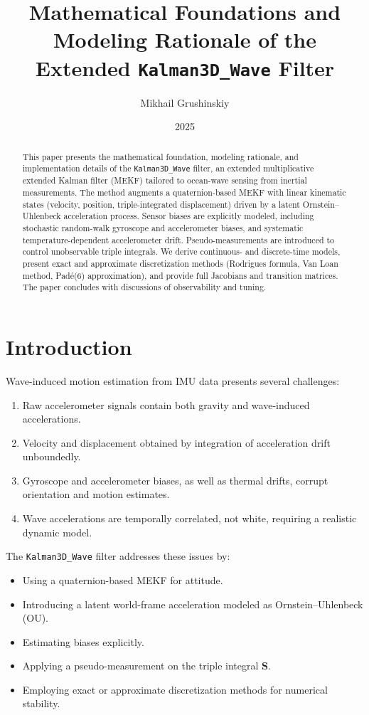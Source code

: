 \documentclass[11pt]{article}
\title{Mathematical Foundations and Modeling Rationale of the Extended \texttt{Kalman3D\_Wave} Filter}
\author{Mikhail Grushinskiy}
\date{2025}
\begin{document}
\maketitle

\begin{abstract}
This paper presents the mathematical foundation, modeling rationale, and 
implementation details of the \texttt{Kalman3D\_Wave} filter, an extended 
multiplicative extended Kalman filter (MEKF) tailored to ocean-wave sensing 
from inertial measurements. The method augments a quaternion-based MEKF with 
linear kinematic states (velocity, position, triple-integrated displacement) 
driven by a latent Ornstein--Uhlenbeck acceleration process. Sensor biases are 
explicitly modeled, including stochastic random-walk gyroscope and accelerometer 
biases, and systematic temperature-dependent accelerometer drift. 
Pseudo-measurements are introduced to control unobservable triple integrals. 
We derive continuous- and discrete-time models, present exact and approximate 
discretization methods (Rodrigues formula, Van Loan method, Padé(6) approximation), 
and provide full Jacobians and transition matrices. The paper concludes with 
discussions of observability and tuning.
\end{abstract}

\section{Introduction}
Wave-induced motion estimation from IMU data presents several challenges:
\begin{enumerate}
\item Raw accelerometer signals contain both gravity and wave-induced accelerations.
\item Velocity and displacement obtained by integration of acceleration drift unboundedly.
\item Gyroscope and accelerometer biases, as well as thermal drifts, corrupt orientation and motion estimates.
\item Wave accelerations are temporally correlated, not white, requiring a realistic dynamic model.
\end{enumerate}

The \texttt{Kalman3D\_Wave} filter addresses these issues by:
\begin{itemize}
\item Using a quaternion-based MEKF for attitude.
\item Introducing a latent world-frame acceleration modeled as Ornstein--Uhlenbeck (OU).
\item Estimating biases explicitly.
\item Applying a pseudo-measurement on the triple integral $\bm S$.
\item Employing exact or approximate discretization methods for numerical stability.
\end{itemize}
\end{document}
